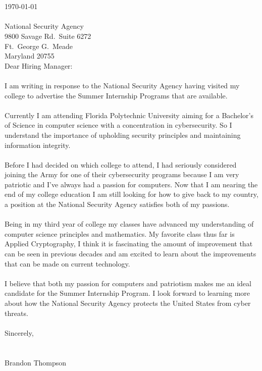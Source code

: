 \documentclass{resume} %
\begin{document}

\begin{rSection}{}
\ \\\
\\
\today \\\\
National Security Agency\\
9800 Savage Rd.\ Suite 6272\\
Ft.\ George G.\ Meade\\
Maryland 20755\\

Dear Hiring Manager:\\
\\
I am writing in response to the National Security Agency having visited my college to advertise the Summer
Internship Programs that are available.\\
\\
Currently I am attending Florida Polytechnic University aiming for a Bachelor's of Science
in computer science with a concentration in cybersecurity.
So I understand the importance of upholding security principles and maintaining information integrity.\\
\\
Before I had decided on which college to attend, I had seriously considered joining the Army for one of
their cybersecurity programs because I am very patriotic and I've always had a passion for computers.
Now that I am nearing the end of my college education I am still looking for how to give back to my country,
a position at the National Security Agency satisfies both of my passions.\\
\\
Being in my third year of college my classes have advanced my understanding of computer science principles
and mathematics. My favorite class thus far is Applied Cryptography, I think it is fascinating the amount
of improvement that can be seen in previous decades and am excited to learn about the improvements that
can be made on current technology.\\
\\
I believe that both my passion for computers and patriotism makes me an ideal candidate for the Summer
Internship Program. I look forward to learning more about how the National Security Agency protects the
United States from cyber threats.\\
\\
Sincerely,\\
\\\\
Brandon Thompson


\end{rSection}
\end{document}
